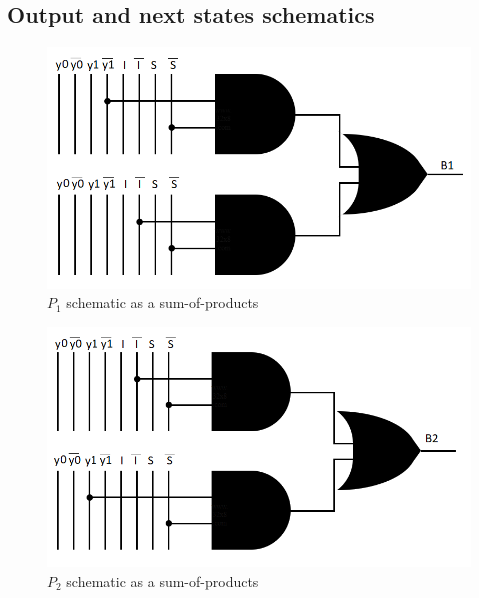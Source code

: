 \documentclass[../../e3_tp3_main.tex]{subfiles}
\begin{document}
\subsection{Output and next states schematics}
\begin{figure}[H]
	\centering
	\includegraphics{figures/mealy_B1_schem.PNG}
	\caption{$P_1$ schematic as a sum-of-products}
	\label{fig:ej1_mealy_P1_schem}
\end{figure}
\begin{figure}[H]
	\centering
	\includegraphics[scale=1]{figures/mealy_B2_schem.PNG}
	\caption{$P_2$ schematic as a sum-of-products}
	\label{fig:ej1_mealy_P2_schem}
\end{figure}
\end{document}
